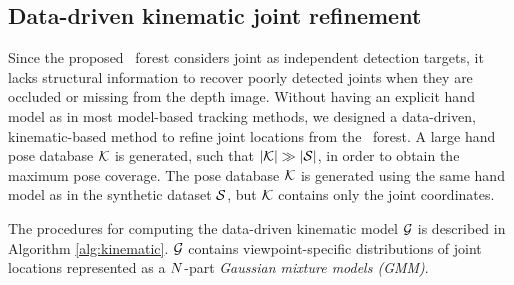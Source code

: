 

\subsection{Data-driven kinematic joint refinement}

Since the proposed \STR\ forest considers joint as independent detection targets, it lacks structural information to recover poorly detected joints when they are occluded or missing from the depth image. 
Without having an explicit hand model as in most model-based tracking methods, we designed a data-driven, kinematic-based method to refine joint locations from the \STR\ forest. 
A large hand pose database $\mathcal{K}$ is generated, such that $|\mathcal{K}| \gg |\mathcal{S}|$, in order to obtain the maximum pose coverage. The pose database $\mathcal{K}$ is generated using the same hand model as in the synthetic dataset $\mathcal{S}$, but $\mathcal{K}$ contains only the joint coordinates. 

The procedures for computing the data-driven kinematic model $\mathcal{G}$ is described in Algorithm \ref{alg:kinematic}. $\mathcal{G}$ contains viewpoint-specific distributions of joint locations represented as a $N$-part \emph{Gaussian mixture models (GMM)}. 

